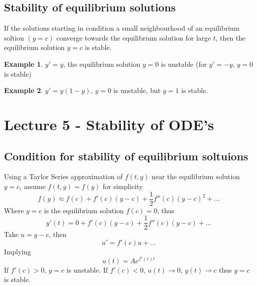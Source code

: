 \documentclass[a6paper]{article}
\theoremstyle{definition}
\newtheorem{example}{Example}
\theoremstyle{plain}
\theoremstyle{remark}
\begin{document}
      \subsection{Stability of equilibrium solutions}
      If the solutions starting in condition a small neighbourhood of an
      equilibrium soltion $ (y = c) $ converge towards the equilibrium solution
      for large $ t $, then the equilibrium solution $ y = c $ is stable.

      \begin{example}
	$ y' = y $, the equilibrium solution $ y = 0 $ is unstable (for $ y'
	= -y $, $ y = 0 $ is stable)
      \end{example}

      \begin{example}
	$ y' = y(1-y) $, $ y = 0 $ is unstable, but $ y = 1 $ is stable.
      \end{example}


\section{Lecture 5 - Stability of ODE's}
\subsection{Condition for stability of equilibrium soltuions}
Using a Taylor Series approximation of $ f(t,y) $ near the equilibrium solution
$ y = c $, assume $ f(t,y) = f(y) $ for simplicity
$$ f(y) \approx f(c) + f'(c)(y-c) + \frac{1}{2} f''(c)(y-c)^2 + ... $$
Where $ y = c  $ is the equilibrium solution $ f(c) = 0 $, thus
$$ y'(t) = 0 + f'(c)(y-c) + \frac{1}{2} f''(c)(y-c) + ... $$
Take $ u = y -c $, then $$ u' = f'(c)u + ... $$
Implying
$$ u(t) = Ae^{f'(c) t} $$
If $ f'(c) > 0 $, $ y = c $ is unstable. If $ f'(c) < 0 $, $ u(t) \to 0 $,
$ y(t) \to c $ thus $ y =c  $ is stable.
\end{document}
